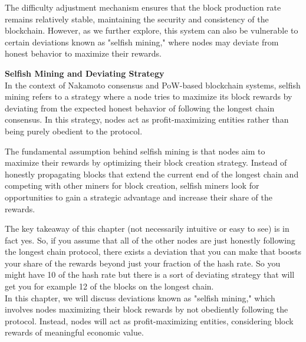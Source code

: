   The difficulty adjustment mechanism ensures that the block production rate remains relatively stable, maintaining the security and consistency of the blockchain. However, as we further explore, this system can also be vulnerable to certain deviations known as "selfish mining," where nodes may deviate from honest behavior to maximize their rewards.
  
  \noindent
  \textbf{Selfish Mining and Deviating Strategy}\\
  In the context of Nakamoto consensus and PoW-based blockchain systems, selfish mining refers to a strategy where a node tries to maximize its block rewards by deviating from the expected honest behavior of following the longest chain consensus. In this strategy, nodes act as profit-maximizing entities rather than being purely obedient to the protocol.
  
  The fundamental assumption behind selfish mining is that nodes aim to maximize their rewards by optimizing their block creation strategy. Instead of honestly propagating blocks that extend the current end of the longest chain and competing with other miners for block creation, selfish miners look for opportunities to gain a strategic advantage and increase their share of the rewards.
  
  
  
  The key takeaway of this chapter (not necessarily intuitive or easy to see) is in fact yes. So, if you assume that all of the other nodes are just honestly following the longest chain protocol, there exists a deviation that you can make that boosts your share of the rewards beyond just your fraction of the hash rate. So you might have 10 of the hash rate but there is a sort of deviating strategy that will get you for example 12 of the blocks on the longest chain.\\
  
  In this chapter, we will discuss deviations known as "selfish mining," which involves nodes maximizing their block rewards by not obediently following the protocol. Instead, nodes will act as profit-maximizing entities, considering block rewards of meaningful economic value.\\
  
